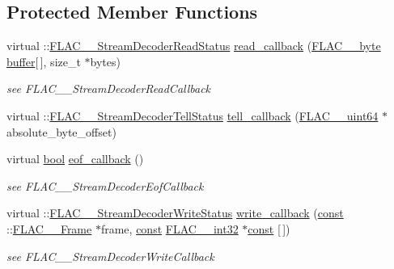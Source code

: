\subsection*{Protected Member Functions}
\begin{DoxyCompactItemize}
\item 
virtual \+::\hyperlink{group__flac__stream__decoder_gad793ead451206c64a91dc0b851027b93}{F\+L\+A\+C\+\_\+\+\_\+\+Stream\+Decoder\+Read\+Status} \hyperlink{class_decoder_a9d1ee0838f1cb840247c8472b9dc9102}{read\+\_\+callback} (\hyperlink{ordinals_8h_a5eb569b12d5b047cdacada4d57924ee3}{F\+L\+A\+C\+\_\+\+\_\+byte} \hyperlink{structbuffer}{buffer}\mbox{[}$\,$\mbox{]}, size\+\_\+t $\ast$bytes)
\begin{DoxyCompactList}\small\item\em see F\+L\+A\+C\+\_\+\+\_\+\+Stream\+Decoder\+Read\+Callback \end{DoxyCompactList}\item 
virtual \+::\hyperlink{group__flac__stream__decoder_ga83708207969383bd7b5c1e9148528845}{F\+L\+A\+C\+\_\+\+\_\+\+Stream\+Decoder\+Tell\+Status} \hyperlink{class_decoder_ac32239a60a784874d29ccd0645707efe}{tell\+\_\+callback} (\hyperlink{ordinals_8h_aa78c8c70a3eb8a58af7436f278acde8e}{F\+L\+A\+C\+\_\+\+\_\+uint64} $\ast$absolute\+\_\+byte\+\_\+offset)
\item 
virtual \hyperlink{mac_2config_2i386_2lib-src_2libsoxr_2soxr-config_8h_abb452686968e48b67397da5f97445f5b}{bool} \hyperlink{class_decoder_ab5d92959536e8ecce07727c2eacd802e}{eof\+\_\+callback} ()
\begin{DoxyCompactList}\small\item\em see F\+L\+A\+C\+\_\+\+\_\+\+Stream\+Decoder\+Eof\+Callback \end{DoxyCompactList}\item 
virtual \+::\hyperlink{group__flac__stream__decoder_ga73f67eb9e0ab57945afe038751bc62c8}{F\+L\+A\+C\+\_\+\+\_\+\+Stream\+Decoder\+Write\+Status} \hyperlink{class_decoder_a0943975f90639e983f434400bd864283}{write\+\_\+callback} (\hyperlink{getopt1_8c_a2c212835823e3c54a8ab6d95c652660e}{const} \+::\hyperlink{struct_f_l_a_c_____frame}{F\+L\+A\+C\+\_\+\+\_\+\+Frame} $\ast$frame, \hyperlink{getopt1_8c_a2c212835823e3c54a8ab6d95c652660e}{const} \hyperlink{ordinals_8h_a33fd77bfe6d685541a0c034a75deccdc}{F\+L\+A\+C\+\_\+\+\_\+int32} $\ast$\hyperlink{getopt1_8c_a2c212835823e3c54a8ab6d95c652660e}{const} \mbox{[}$\,$\mbox{]})
\begin{DoxyCompactList}\small\item\em see F\+L\+A\+C\+\_\+\+\_\+\+Stream\+Decoder\+Write\+Callback \end{DoxyCompactList}\item 

\end{DoxyCompactItemize}
